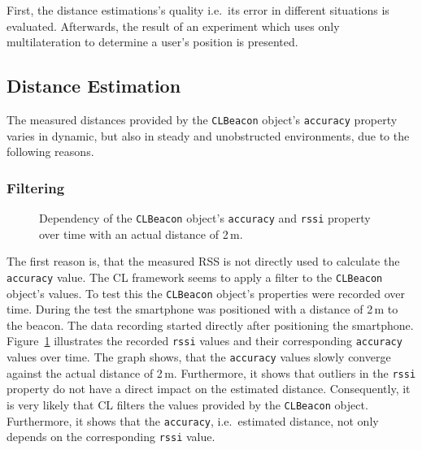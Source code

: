 First, the distance estimations's quality i.e.\ its error in different situations is evaluated. Afterwards, the result of an experiment which uses only multilateration to determine a user's position is presented.

\subsection{Distance Estimation}
The measured distances provided by the \texttt{CLBeacon} object's \texttt{accuracy} property varies in dynamic, but also in steady and unobstructed environments, due to the following reasons.

\subsubsection*{Filtering}
\begin{figure}[t]
	
	\caption {Dependency of the \texttt{CLBeacon} object's \texttt{accuracy} and \texttt{rssi} property over time with an actual distance of 2\,m.}
	\label{fig:beacon_eval_accuracy-rssi}
\end{figure}

The first reason is, that the measured \ac{RSS} is not directly used to calculate the \texttt{accuracy} value. The \acl{CL} framework seems to apply a filter to the \texttt{CLBeacon} object's values. To test this the \texttt{CLBeacon} object's properties were recorded over time. During the test the smartphone was positioned with a distance of 2\,m to the beacon. The data recording started directly after positioning the smartphone. Figure~\ref{fig:beacon_eval_accuracy-rssi} illustrates the recorded \texttt{rssi} values and their corresponding \texttt{accuracy} values over time. The graph shows, that the \texttt{accuracy} values slowly converge against the actual distance of 2\,m. Furthermore, it shows that outliers in the \texttt{rssi} property do not have a direct impact on the estimated distance. Consequently, it is very likely that \ac{CL} filters the values provided by the \texttt{CLBeacon} object. Furthermore, it shows that the \texttt{accuracy}, i.e.\ estimated distance, not only depends on the corresponding \texttt{rssi} value.



